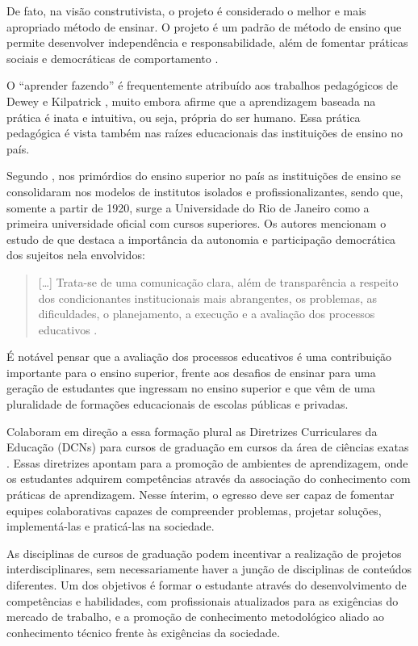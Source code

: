 \documentclass[portuguese]{textolivre}
\begin{document}
De fato, na visão construtivista, o projeto é considerado o melhor e mais apropriado método de ensinar. O projeto é um padrão de método de ensino que permite desenvolver independência e responsabilidade, além de fomentar práticas sociais e democráticas de comportamento \cite{knoll_project_1997}. 

O “aprender fazendo” é frequentemente atribuído aos trabalhos pedagógicos de Dewey e Kilpatrick \cite{retter_centenary_2018}, muito embora \textcite{krueger_real_nodate} afirme que a aprendizagem baseada na prática é inata e intuitiva, ou seja, própria do ser humano. Essa prática pedagógica é vista também nas raízes educacionais das instituições de ensino no país. 

Segundo \textcite{goncalves_o_2017}, nos primórdios do ensino superior no país as instituições de ensino se consolidaram nos modelos de institutos isolados e profissionalizantes, sendo que, somente a partir de 1920, surge a Universidade do Rio de Janeiro como a primeira universidade oficial com cursos superiores. Os autores mencionam o estudo de \textcite{carvalho_o_2011} que destaca a importância da autonomia e participação democrática dos sujeitos nela envolvidos:

\begin{quote}
    […] Trata-se de uma comunicação clara, além de transparência a respeito dos condicionantes institucionais mais abrangentes, os problemas, as dificuldades, o planejamento, a execução e a avaliação dos processos educativos \cite[p. 194]{goncalves_o_2017}.
\end{quote}

É notável pensar que a avaliação dos processos educativos é uma contribuição importante para o ensino superior, frente aos desafios de ensinar para uma geração de estudantes que ingressam no ensino superior e que vêm de uma pluralidade de formações educacionais de escolas públicas e privadas.

Colaboram em direção a essa formação plural as Diretrizes Curriculares da Educação (DCNs) para cursos de graduação em cursos da área de ciências exatas \cite{ministerio_da_educacao_resolucao_2016}. Essas diretrizes apontam para a promoção de ambientes de aprendizagem, onde os estudantes adquirem competências através da associação do conhecimento com práticas de aprendizagem. Nesse ínterim, o egresso deve ser capaz de fomentar equipes colaborativas capazes de compreender problemas, projetar soluções, implementá-las e praticá-las na sociedade. 

As disciplinas de cursos de graduação podem incentivar a realização de projetos interdisciplinares, sem necessariamente haver a junção de disciplinas de conteúdos diferentes. Um dos objetivos é formar o estudante através do  desenvolvimento de competências e habilidades, com profissionais atualizados para as exigências do mercado de trabalho, e a promoção de conhecimento metodológico aliado ao conhecimento técnico frente às exigências da sociedade.
\end{document}
